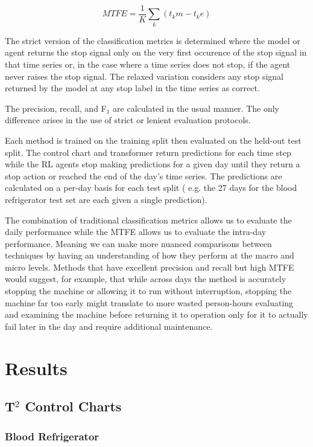 \documentclass[12pt]{article}
\begin{document}
\begin{equation}
    MTFE = \frac{1}{K}\sum_k (t_km-t_ke)
\end{equation}

The strict version of the classification metrics is determined where the model or agent returns the stop signal only on the
very first occurence of the stop signal in that time series or, in the case where a time series does not stop, if the agent
never raises the stop signal. The relaxed variation considers any stop signal returned by the model at any stop label
in the time series as correct.

The precision, recall, and F$_1$ are calculated in the usual manner. The only difference arises in the use of strict or 
lenient evaluation protocols.

Each method is trained on the training split then evaluated on the held-out test split. The control chart and transformer
return predictions for each time step while the RL agents stop making predictions for a given day until they return a stop
action or reached the end of the day's time series. The predictions are calculated on a per-day basis for each test split (
e.g. the 27 days for the blood refrigerator test set are each given a single prediction).

The combination of traditional classification metrics allows us to evaluate the daily performance while the MTFE allows us to
evaluate the intra-day performance. Meaning we can make more nuanced comparisons between techniques by having an understanding
of how they perform at the macro and micro levels. Methods that have excellent precision and recall but high MTFE would suggest,
for example, that while across days the method is accurately stopping the machine or allowing it to run without interruption, stopping
the machine far too early might translate to more wasted person-hours evaluating and examining the machine before returning it to
operation only for it to actually fail later in the day and require additional maintenance.


\section{Results}

\subsection{T$^2$ Control Charts}

\subsubsection{Blood Refrigerator}
\end{document}
